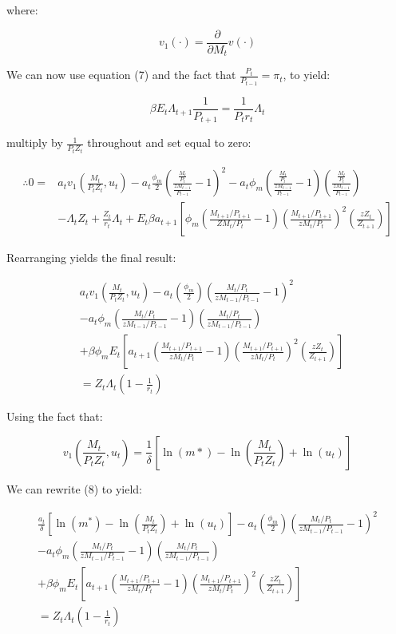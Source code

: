 \documentclass[11pt,preprint, authoryear]{elsarticle}
\numberwithin{equation}{section}
\numberwithin{figure}{section}
\numberwithin{table}{section}
\begin{document}
where:

\[ v_1(\cdot) = \frac{\partial}{\partial M_t} v(\cdot) \]

We can now use equation (7) and the fact that
\(\frac{P_t}{P_{t-1}} = \pi_t\), to yield:

\[ \beta E_t \Lambda_{t+1} \frac{1}{P_{t+1}} = \frac{1}{P_tr_t} \Lambda_t \]

multiply by \(\frac{1} {P_t Z_t}\) throughout and set equal to zero:

\[\begin{aligned} \therefore 0 = & a_tv_1(\frac{M_t}{P_tZ_t}, u_t) - a_t\frac{\phi_m}{2}(\frac{\frac{M_t}{P_t}}{\frac{zM_{t-1}}{P_{t-1}}}-1)^2 -  a_t \phi_m(\frac{\frac{M_t}{P_t}}{\frac{zM_{t-1}}{P_{t-1}}}-1)(\frac{\frac{M_t}{P_{t}}}{\frac{zM_{t-1}}{P_{t-1}}})\\
& - \Lambda_t Z_t + \frac{Z_t}{r_t} \Lambda_t + E_t\beta a_{t+1} \left[\phi_m(\frac{M_{t+1}/P_{t+1}}{ZM_t/P_t}-1) \left(\frac{M_{t+1}/P_{t+1}}{zM_{t}/P_{t}} \right)^2(\frac{zZ_t}{Z_{t+1}}) \right] \end{aligned}\]

Rearranging yields the final result:

\[\begin{aligned}
&a_{t} v_{1}\left(\frac{M_{t}}{P_{t} Z_{t}}, u_{t}\right)-a_{t}\left(\frac{\phi_{m}}{2}\right)\left(\frac{M_{t} / P_{t}}{z M_{t-1} / P_{t-1}}-1\right)^{2} \\
&-a_{t} \phi_{m}\left(\frac{M_{t} / P_{t}}{z M_{t-1} / P_{t-1}}-1\right)\left(\frac{M_{t} / P_{t}}{z M_{t-1} / P_{t-1}}\right) \\
&+\beta \phi_{m} E_{t}\left[a_{t+1}\left(\frac{M_{t+1} / P_{t+1}}{z M_{t} / P_{t}}-1\right)\left(\frac{M_{t+1} / P_{t+1}}{z M_{t} / P_{t}}\right)^{2}\left(\frac{z Z_{t}}{Z_{t+1}}\right)\right] \\
&=Z_{t} \Lambda_{t}\left(1-\frac{1}{r_{t}}\right)
\end{aligned} \tag{8}\]

Using the fact that:

\[v_1(\frac{M_t}{P_tZ_t},u_t) = \frac{1}{\delta}[\ln(m*) - \ln(\frac{M_t}{P_tZ_t}) + \ln(u_t)]\]

We can rewrite (8) to yield:

\[\begin{array}{l}
\frac{a_{t}}{\delta}\left[\ln \left(m^{*}\right)-\ln \left(\frac{M_{t}}{P_{t} Z_{t}}\right)+\ln \left(u_{t}\right)\right]-a_{t}\left(\frac{\phi_{m}}{2}\right)\left(\frac{M_{t} / P_{t}}{z M_{t-1} / P_{t-1}}-1\right)^{2} \\
-a_{t} \phi_{m}\left(\frac{M_{t} / P_{t}}{z M_{t-1} / P_{t-1}}-1\right)\left(\frac{M_{t} / P_{t}}{z M_{t-1} / P_{t-1}}\right) \\
+\beta \phi_{m} E_{t}\left[a_{t+1}\left(\frac{M_{t+1} / P_{t+1}}{z M_{t} / P_{t}}-1\right)\left(\frac{M_{t+1} / P_{t+1}}{z M_{t} / P_{t}}\right)^{2}\left(\frac{z Z_{t}}{Z_{t+1}}\right)\right] \\
=Z_{t} \Lambda_{t}\left(1-\frac{1}{r_{t}}\right)
\end{array} \tag{9}\]
\end{document}
